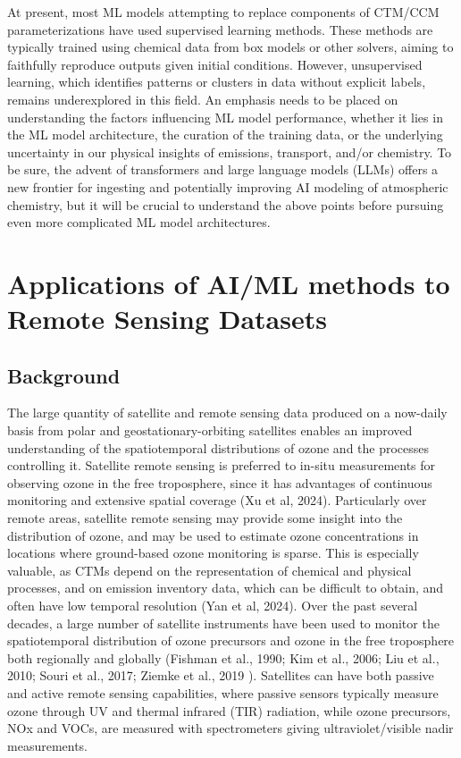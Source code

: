\documentclass[gmd, manuscript]{copernicus}
\begin{document}
At present, most ML models attempting to replace components of CTM/CCM parameterizations have used supervised learning methods. These methods are typically trained using chemical data from box models or other solvers, aiming to faithfully reproduce outputs given initial conditions. However, unsupervised learning, which identifies patterns or clusters in data without explicit labels, remains underexplored in this field. An emphasis needs to be placed on understanding the factors influencing ML model performance, whether it lies in the ML model architecture, the curation of the training data, or the underlying uncertainty in our physical insights of emissions, transport, and/or chemistry. To be sure, the advent of transformers and large language models (LLMs) offers a new frontier for ingesting and potentially improving AI modeling of atmospheric chemistry, but it will be crucial to understand the above points before pursuing even more complicated ML model architectures.


\section{Applications of AI/ML methods to Remote Sensing Datasets}


\subsection{Background}
The large quantity of satellite and remote sensing data produced on a now-daily basis from polar and geostationary-orbiting satellites enables an improved understanding of the spatiotemporal distributions of ozone and the processes controlling it. Satellite remote sensing is preferred to in-situ measurements for observing ozone in the free troposphere, since it has advantages of continuous monitoring and extensive spatial coverage (Xu et al, 2024). Particularly over remote areas, satellite remote sensing may provide some insight into the distribution of ozone, and may be used to estimate ozone concentrations in locations where ground-based ozone monitoring is sparse. This is especially valuable, as CTMs depend on the representation of chemical and physical processes, and on emission inventory data, which can be difficult to obtain, and often have low temporal resolution (Yan et al, 2024). Over the past several decades, a large number of satellite instruments have been used to monitor the spatiotemporal distribution of ozone precursors and ozone in the free troposphere both regionally and globally (Fishman et al., 1990; Kim et al., 2006; Liu et al., 2010; Souri et al., 2017; Ziemke et al., 2019 ). Satellites can have both passive and active remote sensing capabilities, where passive sensors typically measure ozone through UV and thermal infrared (TIR) radiation, while ozone precursors, NOx and VOCs, are measured with spectrometers giving ultraviolet/visible nadir measurements. 
\end{document}
